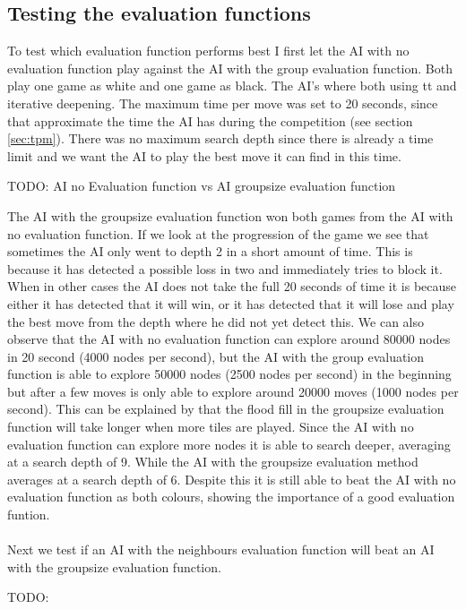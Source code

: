 \documentclass{article}
\begin{document}
\subsection{Testing the evaluation functions}
To test which evaluation function performs best I first let the AI with no evaluation function play against the AI with the group evaluation function. Both play one game as white and one game as black. The AI's where both using tt and iterative deepening. The maximum time per move was set to 20 seconds, since that approximate the time the AI has during the competition (see section \ref{sec:tpm}). There was no maximum search depth since there is already a time limit and we want the AI to play the best move it can find in this time.

TODO: AI no Evaluation function vs AI groupsize evaluation function

The AI with the groupsize evaluation function won both games from the AI with no evaluation function. If we look at the progression of the game we see that sometimes the AI only went to depth 2 in a short amount of time. This is because it has detected a possible loss in two and immediately tries to block it. When in other cases the AI does not take the full 20 seconds of time it is because either it has detected that it will win, or it has detected that it will lose and play the best move from the depth where he did not yet detect this. We can also observe that the AI with no evaluation function can explore around 80000 nodes in 20 second (4000 nodes per second), but the AI with the group evaluation function is able to explore 50000 nodes (2500 nodes per second) in the beginning but after a few moves is only able to explore around 20000 moves (1000 nodes per second). This can be explained by that the flood fill in the groupsize evaluation function will take longer when more tiles are played. Since the AI with no evaluation function can explore more nodes it is able to search deeper, averaging at a search depth of 9. While the AI with the groupsize evaluation method averages at a search depth of 6. Despite this it is still able to beat the AI with no evaluation function as both colours, showing the importance of a good evaluation funtion.
\\
\\
Next we test if an AI with the neighbours evaluation function will beat an AI with the groupsize evaluation function.

TODO: 
\end{document}
